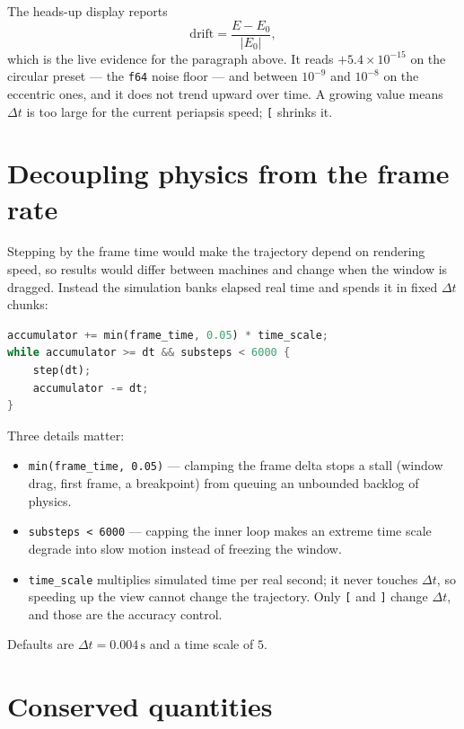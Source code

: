\documentclass[11pt,a4paper]{article}
\newcommand{\dt}{\Delta t}
\begin{document}
The heads-up display reports
\[
  \text{drift} = \frac{E - E_0}{|E_0|},
\]
which is the live evidence for the paragraph above. It reads
$+5.4\times10^{-15}$ on the circular preset --- the \texttt{f64} noise floor ---
and between $10^{-9}$ and $10^{-8}$ on the eccentric ones, and it does not trend
upward over time. A growing value means $\dt$ is too large for the current
periapsis speed; \texttt{[} shrinks it.

\section{Decoupling physics from the frame rate}

Stepping by the frame time would make the trajectory depend on rendering speed,
so results would differ between machines and change when the window is dragged.
Instead the simulation banks elapsed real time and spends it in fixed $\dt$
chunks:

\begin{lstlisting}[language=Rust]
accumulator += min(frame_time, 0.05) * time_scale;
while accumulator >= dt && substeps < 6000 {
    step(dt);
    accumulator -= dt;
}
\end{lstlisting}

Three details matter:

\begin{itemize}\itemsep3pt
  \item \texttt{min(frame\_time, 0.05)} --- clamping the frame delta stops a
    stall (window drag, first frame, a breakpoint) from queuing an unbounded
    backlog of physics.
  \item \texttt{substeps < 6000} --- capping the inner loop makes an extreme
    time scale degrade into slow motion instead of freezing the window.
  \item \texttt{time\_scale} multiplies simulated time per real second; it never
    touches $\dt$, so speeding up the view cannot change the trajectory. Only
    \texttt{[} and \texttt{]} change $\dt$, and those are the accuracy control.
\end{itemize}

Defaults are $\dt = 0.004\,\mathrm{s}$ and a time scale of $5$.

\section{Conserved quantities}
\label{sec:conserved}
\end{document}
